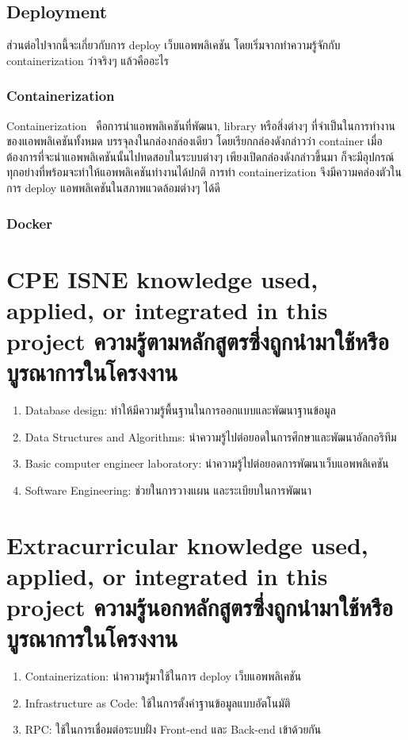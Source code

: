 \subsection{Deployment}
ส่วนต่อไปจากนี้จะเกี่ยวกับการ deploy เว็บแอพพลิเคชัน โดยเริ่มจากทำความรู้จักกับ 
containerization ว่าจริงๆ แล้วคืออะไร
\subsubsection{Containerization}
Containerization~\cite{ctnrh} คือการนำแอพพลิเคชันที่พัฒนา, library หรือสิ่งต่างๆ 
ที่จำเป็นในการทำงานของแอพพลิเคชันทั้งหมด บรรจุลงในกล่องกล่องเดียว โดยเรียกกล่องดังกล่าวว่า container 
เมื่อต้องการที่จะนำแอพพลิเคชันนั้นไปทดสอบในระบบต่างๆ เพียงเปิดกล่องดังกล่าวขึ้นมา
ก็จะมีอุปกรณ์ทุกอย่างที่พร้อมจะทำให้แอพพลิเคชันทำงานได้ปกติ การทำ containerization 
จึงมีความคล่องตัวในการ deploy แอพพลิเคชันในสภาพแวดล้อมต่างๆ ได้ดี 
\subsubsection{Docker}


\section{\ifenglish%
        \ifcpe CPE \else ISNE \fi knowledge used, applied, or integrated in this project
  \else%
        ความรู้ตามหลักสูตรซึ่งถูกนำมาใช้หรือบูรณาการในโครงงาน
  \fi
 }
\begin{enumerate}
      \item Database design: ทำให้มีความรู้พื้นฐานในการออกแบบและพัฒนาฐานข้อมูล
      \item Data Structures and Algorithms: นำความรู้ไปต่อยอดในการศึกษาและพัฒนาอัลกอริทึม
      \item Basic computer engineer laboratory: นำความรู้ไปต่อยอดการพัฒนาเว็บแอพพลิเคชัน
      \item Software Engineering: ช่วยในการวางแผน และระเบียบในการพัฒนา
\end{enumerate}


\section{\ifenglish%
        Extracurricular knowledge used, applied, or integrated in this project
  \else%
        ความรู้นอกหลักสูตรซึ่งถูกนำมาใช้หรือบูรณาการในโครงงาน
  \fi
 }
\begin{enumerate}
      \item Containerization: นำความรู้มาใช้ในการ deploy เว็บแอพพลิเคชัน
      \item Infrastructure as Code: ใช้ในการตั้งค่าฐานข้อมูลแบบอัตโนมัติ
      \item RPC: ใช้ในการเชื่อมต่อระบบฝั่ง Front-end และ Back-end เข้าด้วยกัน
\end{enumerate}
